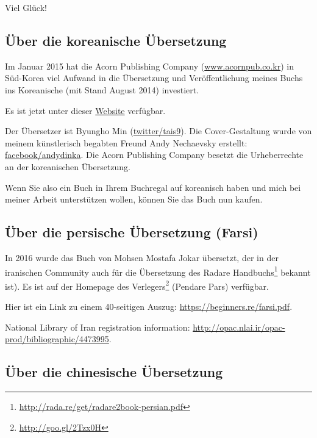 Viel Glück!

\subsection*{Über die koreanische Übersetzung}

Im Januar 2015 hat die Acorn Publishing Company (\href{http://www.acornpub.co.kr}{www.acornpub.co.kr}) in Süd-Korea
viel Aufwand in die Übersetzung und Veröffentlichung meines Buchs ins Koreanische (mit Stand August 2014) investiert.

Es ist jetzt unter dieser \href{http://go.yurichev.com/17343}{Website} verfügbar.

Der Übersetzer ist Byungho Min (\href{http://go.yurichev.com/17344}{twitter/tais9}).
Die Cover-Gestaltung wurde von meinem künstlerisch begabten Freund Andy Nechaevsky erstellt:
\href{http://go.yurichev.com/17023}{facebook/andydinka}.
Die Acorn Publishing Company besetzt die Urheberrechte an der koreanischen Übersetzung.

Wenn Sie also ein  Buch in Ihrem Buchregal auf koreanisch haben und 
mich bei meiner Arbeit unterstützen wollen, können Sie das Buch nun kaufen.

\subsection*{Über die persische Übersetzung (Farsi)}

In 2016 wurde das Buch von Mohsen Mostafa Jokar übersetzt, der in der iranischen Community
auch für die Übersetzung des Radare
Handbuchs\footnote{\url{http://rada.re/get/radare2book-persian.pdf}} bekannt ist).
Es ist auf der Homepage des Verlegers\footnote{\url{http://goo.gl/2Tzx0H}} (Pendare Pars)
verfügbar.

Hier ist ein Link zu einem 40-seitigen Auszug: \url{https://beginners.re/farsi.pdf}.

National Library of Iran registration information: \url{http://opac.nlai.ir/opac-prod/bibliographic/4473995}.

\subsection*{Über die chinesische Übersetzung}

